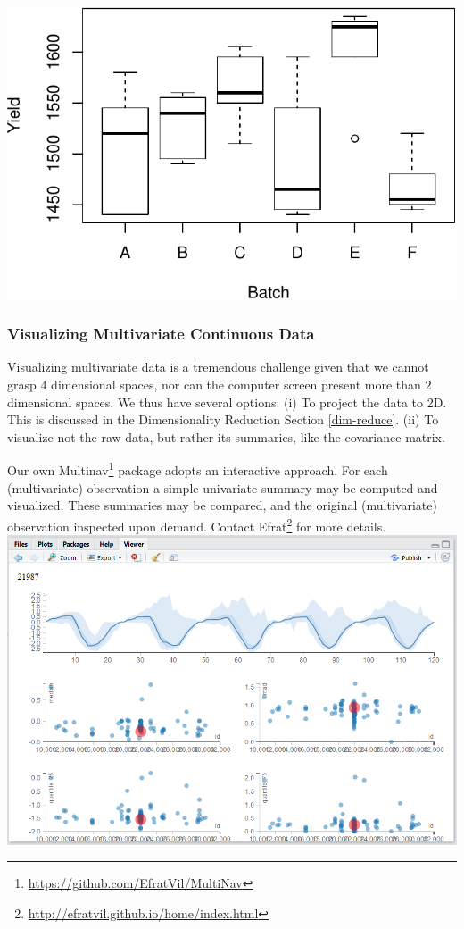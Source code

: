 \documentclass[]{book}
\renewcommand{\href}[2]{#2\footnote{\url{#1}}}
\theoremstyle{definition}
\theoremstyle{definition}
\theoremstyle{definition}
\theoremstyle{remark}
\begin{document}
\includegraphics[width=0.5\linewidth]{Rcourse_files/figure-latex/unnamed-chunk-141-1}

\hypertarget{visualizing-multivariate-continuous-data}{%
\subsubsection{Visualizing Multivariate Continuous Data}\label{visualizing-multivariate-continuous-data}}

Visualizing multivariate data is a tremendous challenge given that we cannot grasp \(4\) dimensional spaces, nor can the computer screen present more than \(2\) dimensional spaces.
We thus have several options:
(i) To project the data to 2D. This is discussed in the Dimensionality Reduction Section \ref{dim-reduce}.
(ii) To visualize not the raw data, but rather its summaries, like the covariance matrix.

Our own \href{https://github.com/EfratVil/MultiNav}{Multinav} package adopts an interactive approach.
For each (multivariate) observation a simple univariate summary may be computed and visualized.
These summaries may be compared, and the original (multivariate) observation inspected upon demand.
Contact \href{http://efratvil.github.io/home/index.html}{Efrat} for more details.\\
\includegraphics{art/multinav.png}
\end{document}
